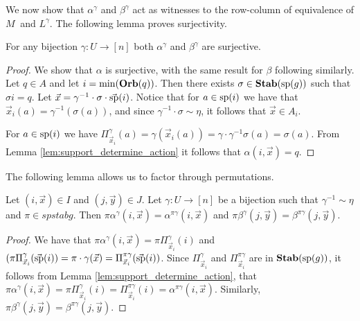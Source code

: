 \documentclass[../paper.tex]{subfiles}
\begin{document}
We now show that $\alpha^{\gamma}$ and $\beta^{\gamma}$ act as witnesses to the
row-column of equivalence of $M_{~}$ and $L^{\gamma}$. The following lemma
proves surjectivity.


\begin{lem} 
  For any bijection $\gamma : U \rightarrow [n]$ both $\alpha^{\gamma}$ and
  $\beta^{\gamma}$ are surjective.
  \label{lem:alpha-beta-surjective}
\end{lem}
\begin{proof}
  We show that $\alpha$ is surjective, with the same result for $\beta$
  following similarly. Let $q \in A$ and let $i = \min (\text{\textbf{Orb}} (q))$. Then there
  exists $\sigma \in \text{\textbf{Stab}} (\text{sp} (g))$ such that $\sigma i = q$. Let $\vec{x} =
  \gamma^{-1} \cdot \sigma \cdot \vec{\text{sp}}(i)$. Notice that for $a \in
  \text{sp}(i)$ we have that $\vec{x}_i(a) = \gamma^{-1} (\sigma (a))$, and since
  $\gamma^{-1} \cdot \sigma \sim \eta$, it follows that $\vec{x} \in A_i$.

  For $a \in \text{sp}(i)$ we have $\Pi^{\gamma}_{\vec{x}_i} (a) = \gamma
  (\vec{x}_i(a)) = \gamma \cdot \gamma^{-1} \sigma (a) = \sigma (a)$. From Lemma
  \ref{lem:support_determine_action} it follows that $\alpha(i, \vec{x}) = q$.
\end{proof}

The following lemma allows us to factor through permutations.
\begin{lem}
  \label{lem:alpha_and_gamma}
  Let $(i,\vec{x}) \in I$ and $(j, \vec{y}) \in J$. Let $\gamma: U \rightarrow
  [n]$ be a bijection such that $\gamma^{-1} \sim \eta$ and $\pi \in spstab{g}$.
  Then $\pi \alpha^{\gamma}(i, \vec{x}) = \alpha^{\pi \gamma}(i, \vec{x})$ and
  $\pi \beta^{\gamma}(j, \vec{y}) = \beta^{\pi \gamma}(j, \vec{y})$.
\end{lem}
\begin{proof}
  We have that $\pi \alpha^{\gamma}(i, \vec{x}) = \pi
  \Pi^{\gamma}_{\vec{x}_i}(i)$ and $(\pi
  \Pi^{\gamma}_{\vec{x}_{i}}(\vec{\text{sp}}(i)) = \pi \cdot \gamma (\vec{x}) =
  \Pi^{\pi \gamma}_{\vec{x}_i}(\vec{\text{sp}}(i))$. Since
  $\Pi^{\gamma}_{\vec{x}_i}$ and $\Pi^{\pi \gamma}_{\vec{x}_i}$ are in
  $\text{\textbf{Stab}} (\text{sp} (g))$, it follows from Lemma \ref{lem:support_determine_action}, that
  $\pi \alpha^{\gamma}(i, \vec{x}) = \pi \Pi^{\gamma}_{\vec{x}_i} (i) = \Pi^{\pi
    \gamma}_{\vec{x}_i}(i) = \alpha^{\pi \gamma}(i, \vec{x})$. Similarly, $\pi
  \beta^{\gamma}(j, \vec{y}) = \beta^{\pi \gamma} (j, \vec{y})$.
\end{proof}
\end{document}

